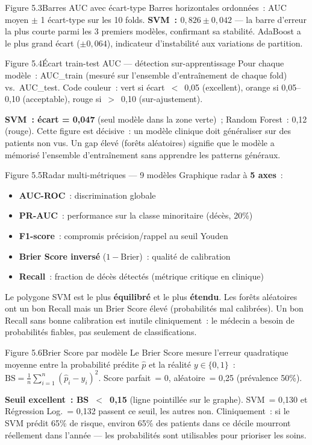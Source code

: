\documentclass[12pt,a4paper]{article}
\begin{document}
\begin{figbox}{Figure 5.3}{Barres AUC avec écart-type}
Barres horizontales ordonnées~: AUC moyen $\pm$ 1 écart-type sur les 10 folds.
\textbf{SVM~: $0{,}826 \pm 0{,}042$} --- la barre d'erreur la plus courte parmi
les 3 premiers modèles, confirmant sa stabilité. AdaBoost a le plus grand écart
($\pm 0{,}064$), indicateur d'instabilité aux variations de partition.
\end{figbox}

\begin{figbox}{Figure 5.4}{Écart train-test AUC --- détection sur-apprentissage}
Pour chaque modèle~: AUC\_train (mesuré sur l'ensemble d'entraînement de chaque
fold) vs.\ AUC\_test. Code couleur~: vert si écart~$<$~0{,}05 (excellent),
orange si 0{,}05--0{,}10 (acceptable), rouge si~$>$~0{,}10 (sur-ajustement).

\textbf{SVM~: écart = 0{,}047} (seul modèle dans la zone verte)~; Random Forest~:
0{,}12 (rouge). Cette figure est décisive~: un modèle clinique doit généraliser
sur des patients non vus. Un gap élevé (forêts aléatoires) signifie que le
modèle a mémorisé l'ensemble d'entraînement sans apprendre les patterns généraux.
\end{figbox}

\begin{figbox}{Figure 5.5}{Radar multi-métriques --- 9 modèles}
Graphique radar à \textbf{5 axes}~:
\begin{itemize}[leftmargin=1.5em, itemsep=1pt]
  \item \textbf{AUC-ROC}~: discrimination globale
  \item \textbf{PR-AUC}~: performance sur la classe minoritaire (décès, 20\%)
  \item \textbf{F1-score}~: compromis précision/rappel au seuil Youden
  \item \textbf{Brier Score inversé} ($1-\text{Brier}$)~: qualité de calibration
  \item \textbf{Recall}~: fraction de décès détectés (métrique critique en clinique)
\end{itemize}
Le polygone SVM est le plus \textbf{équilibré} et le plus \textbf{étendu}.
Les forêts aléatoires ont un bon Recall mais un Brier Score élevé (probabilités
mal calibrées). Un bon Recall sans bonne calibration est inutile cliniquement~:
le médecin a besoin de probabilités fiables, pas seulement de classifications.
\end{figbox}

\begin{figbox}{Figure 5.6}{Brier Score par modèle}
Le Brier Score mesure l'erreur quadratique moyenne entre la probabilité prédite
$\hat{p}$ et la réalité $y \in \{0,1\}$~:
$\text{BS} = \frac{1}{n}\sum_{i=1}^{n}(\hat{p}_i - y_i)^2$.
Score parfait~= 0, aléatoire~= 0{,}25 (prévalence 50\%).

\textbf{Seuil excellent~: BS~$<$~0{,}15} (ligne pointillée sur le graphe).
SVM~= 0{,}130 et Régression Log.~= 0{,}132 passent ce seuil, les autres non.
Cliniquement~: si le SVM prédit 65\% de risque, environ 65\% des patients
dans ce décile mourront réellement dans l'année --- les probabilités sont
utilisables pour prioriser les soins.
\end{figbox}
\end{document}
